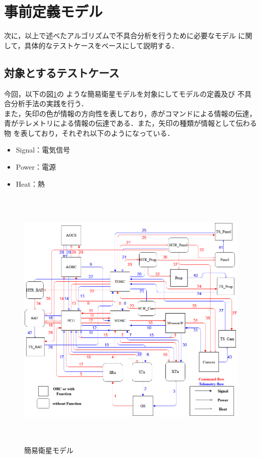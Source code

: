 \documentclass[11pt]{jsreport}
\begin{document}


\section{事前定義モデル}
次に，以上で述べたアルゴリズムで不具合分析を行うために必要なモデル
に関して，具体的なテストケースをベースにして説明する．%

\subsection{対象とするテストケース}
今回，以下の図\ref{fig:simple_sat}の
ような簡易衛星モデルを対象にしてモデルの定義及び
不具合分析手法の実践を行う．\\
また，矢印の色が情報の方向性を表しており，赤がコマンドによる情報の伝達，
青がテレメトリによる情報の伝達である．また，矢印の種類が情報として伝わる物
を表しており，それぞれ以下のようになっている．
\begin{itemize}
   \item Signal：電気信号
   \item Power：電源
   \item Heat：熱
\end{itemize}
\begin{figure}[H]
   \centering
      \includegraphics[height=13.0cm]{figure/satellite_diagram.png}
      \caption{簡易衛星モデル}
      \label{fig:simple_sat}
\end{figure}
\end{document}
